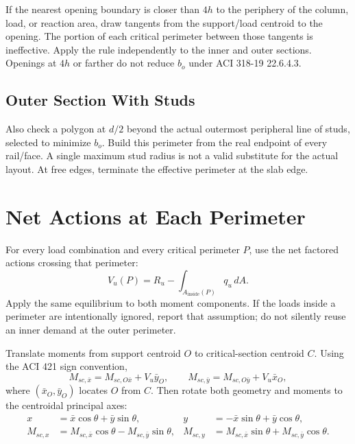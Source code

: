 \documentclass[10pt]{article}
\begin{document}
If the nearest opening boundary is closer than $4h$ to the periphery of the
column, load, or reaction area, draw tangents from the support/load centroid to
the opening. The portion of each critical perimeter between those tangents is
ineffective. Apply the rule independently to the inner and outer sections.
Openings at $4h$ or farther do not reduce $b_o$ under ACI 318-19 22.6.4.3.

\subsection{Outer Section With Studs}

Also check a polygon at $d/2$ beyond the actual outermost peripheral line of
studs, selected to minimize $b_o$. Build this perimeter from the real endpoint
of every rail/face. A single maximum stud radius is not a valid substitute for
the actual layout. At free edges, terminate the effective perimeter at the slab
edge.

\section{Net Actions at Each Perimeter}

For every load combination and every critical perimeter $P$, use the net
factored actions crossing that perimeter:
\begin{equation}
V_u(P)=R_u-\int_{A_{\mathrm{inside}}(P)}q_u\,dA.
\end{equation}
Apply the same equilibrium to both moment components. If the loads inside a
perimeter are intentionally ignored, report that assumption; do not silently
reuse an inner demand at the outer perimeter.

Translate moments from support centroid $O$ to critical-section centroid $C$.
Using the ACI 421 sign convention,
\begin{equation}
M_{sc,\bar x}=M_{sc,O\bar x}+V_u\bar y_O,\qquad
M_{sc,\bar y}=M_{sc,O\bar y}+V_u\bar x_O,
\end{equation}
where $(\bar x_O,\bar y_O)$ locates $O$ from $C$. Then rotate both geometry and
moments to the centroidal principal axes:
\begin{equation}
\begin{aligned}
x&=\bar x\cos\theta+\bar y\sin\theta,&
y&=-\bar x\sin\theta+\bar y\cos\theta,\\
M_{sc,x}&=M_{sc,\bar x}\cos\theta-M_{sc,\bar y}\sin\theta,&
M_{sc,y}&=M_{sc,\bar x}\sin\theta+M_{sc,\bar y}\cos\theta.
\end{aligned}
\end{equation}
\end{document}
